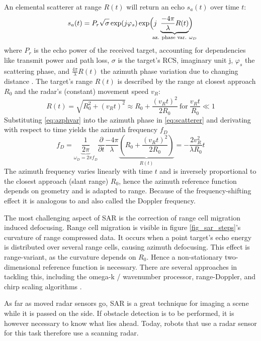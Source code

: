 An elemental scatterer at range \(R(t)\) will return an echo \(s_a(t)\)
over time \(t\): 
\begin{equation} \label{eq:scatterer}
	s_a(t) = P_r \sqrt{\sigma\vphantom{1}}
	\exp(j\varphi_s)
	\exp\Bigl(
	    j~\underbrace{\frac{-4\pi}{\lambda}R(t)}_{
	        \mathclap{ \text{ az. phase var. $\omega_D$ }}
	        }
        \Bigr)
\end{equation}
where \(P_r\) is the echo power of the received target, accounting
for dependencies like transmit power and path loss, \(\sigma\) is the
target's RCS, imaginary unit \si{j}, \(\varphi_s\) the scattering phase,
and \(\frac{4\pi}{\lambda}R(t)\) the azimuth phase variation due to
changing distance \cite{Cumming2004}. The target's range \(R(t)\) is
described by the range at closest approach \(R_0\) and the radar's
(constant) movement speed \(v_R\): 
\begin{equation} \label{eq:azphvar}
	R(t) = \sqrt{R_0^2+\left(v_Rt\right)^2} \approx R_0 + \frac{(v_Rt)^2}{2R_0} ~\text{for}~ \frac{v_Rt}{R_0} \ll 1
\end{equation}
Substituting \cref{eq:azphvar} into the azimuth phase in \cref{eq:scatterer} and derivating
with respect to time yields the azimuth frequency \(f_D\) 
\begin{equation}
	f_D = \underbrace{\frac{1}{2\pi}}_{\omega_D = 2\pi f_D} \frac{\partial}{\partial t} \frac{-4\pi}{\lambda}  \underbrace{\left( R_0 + \frac{(v_Rt)^2}{2R_0}  \right)}_{R(t)} = -\frac{2v_R^2}{\lambda R_0}t
\end{equation}
The azimuth frequency varies linearly with time \(t\) and is
inversely proportional to the closest approach (slant range) \(R_0\),
hence the azimuth reference function depends on geometry and is adapted
to range. Because of the frequency-shifting effect it is analogous to
and also called the Doppler frequency.

The most challenging aspect of SAR is the correction of range cell
migration induced defocusing. Range cell migration is visible in figure
\cref{fig_sar_steps}'s curvature of range compressed data. It occurs when a point
target's echo energy is distributed over several range cells, causing
azimuth defocusing. This effect is range-variant, as the curvature
depends on \(R_0\). Hence a non-stationary two-dimensional reference
function is necessary. There are several approaches in tackling this,
including the omega-k / wavenumber processor, range-Doppler, and chirp
scaling algorithms \cite{Moreira2013}.

As far as moved radar sensors go, SAR is a great technique for imaging a scene while it is passed on the side. If obstacle detection is to be performed, it is however necessary to know what lies ahead. Today, robots that use a radar sensor for this task therefore use a scanning radar.


